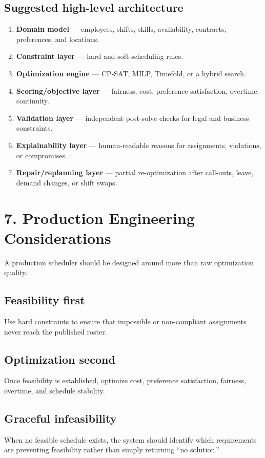 \documentclass[11pt]{article}
\begin{document}
\subsection{Suggested high-level architecture}

\begin{enumerate}
  \item \textbf{Domain model} --- employees, shifts, skills, availability, contracts, preferences, and locations.
  \item \textbf{Constraint layer} --- hard and soft scheduling rules.
  \item \textbf{Optimization engine} --- CP-SAT, MILP, Timefold, or a hybrid search.
  \item \textbf{Scoring/objective layer} --- fairness, cost, preference satisfaction, overtime, continuity.
  \item \textbf{Validation layer} --- independent post-solve checks for legal and business constraints.
  \item \textbf{Explainability layer} --- human-readable reasons for assignments, violations, or compromises.
  \item \textbf{Repair/replanning layer} --- partial re-optimization after call-outs, leave, demand changes, or shift swaps.
\end{enumerate}

\section{7. Production Engineering Considerations}

A production scheduler should be designed around more than raw optimization quality.

\subsection{Feasibility first}
Use hard constraints to ensure that impossible or non-compliant assignments never reach the published roster.

\subsection{Optimization second}
Once feasibility is established, optimize cost, preference satisfaction, fairness, overtime, and schedule stability.

\subsection{Graceful infeasibility}
When no feasible schedule exists, the system should identify which requirements are preventing feasibility rather than simply returning ``no solution.''
\end{document}
